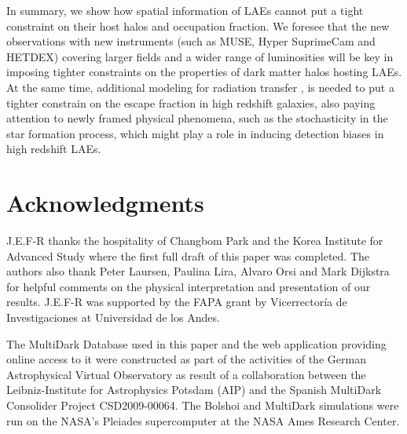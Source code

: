 \documentclass[usenatbib]{mn2e}
\newcommand{\ly}{{\ifmmode{{\rm Ly}\alpha}\else{Ly$\alpha$~}\fi}}
\begin{document}
In summary, we show how spatial information of LAEs cannot
put a tight constraint on their host halos and occupation fraction. We
foresee that the new observations with new instruments (such as MUSE,
Hyper SuprimeCam and HETDEX) covering larger fields and a wider range
of luminosities will be key in imposing tighter constraints on the
properties of dark matter halos hosting LAEs. At the same time,
additional modeling for \ly radiation transfer , is needed to put a
tighter constrain on the \ly escape fraction in high redshift
galaxies, also paying attention to newly framed physical phenomena, such as the
stochasticity \citep{ForeroRomero2013} in the star formation process,
which might play a role in inducing detection biases in high redshift LAEs.


\section*{Acknowledgments} 
J.E.F-R thanks the hospitality of Changbom Park and the Korea
Institute for Advanced Study where the first full draft of this paper
was completed. The authors also thank Peter Laursen, Paulina Lira, 
Alvaro Orsi and Mark Dijkstra for helpful comments on the physical
interpretation and presentation of our results. J.E.F-R was
supported by the FAPA grant by Vicerrector\'ia de Investigaciones at
Universidad de los Andes.

The MultiDark Database used in this paper and the web application
providing online access to it were constructed as part of the
activities of the German Astrophysical Virtual Observatory as result
of a collaboration between the Leibniz-Institute for Astrophysics
Potsdam (AIP) and the Spanish MultiDark Consolider Project
CSD2009-00064. The Bolshoi and MultiDark simulations were run on the
NASA's Pleiades supercomputer at the NASA Ames Research Center.
\end{document}
